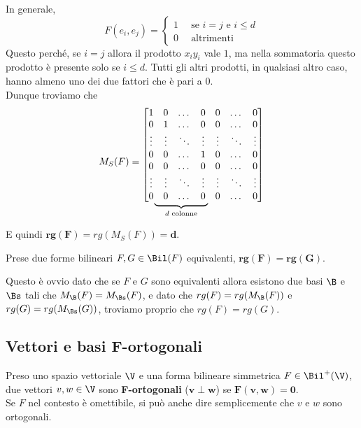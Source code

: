 \documentclass[11pt, a4paper, titlepage, oneside]{scrbook}
\begin{document}
In generale, 
\[
F(e_i,e_j) = 
\begin{cases}
1 & \enspace \text{se } i = j \text{ e } i \leq d\\
0 & \enspace \text{altrimenti}
\end{cases}
\]
Questo perché, se $i = j$ allora il prodotto $x_i y_i$ vale $1$, ma nella sommatoria questo prodotto è presente solo se $i \leq d$. Tutti gli altri prodotti, in qualsiasi altro caso, hanno almeno uno dei due fattori che è pari a $0$. \\
Dunque troviamo che
\[
M_S(F) = 
\begin{array}{@{}c@{}}
    \begin{bmatrix}
        1 & 0 & \dots & 0 & 0 & \dots & 0 \\
        0 & 1 & \dots & 0 & 0 & \dots & 0 \\
        \vdots & \vdots & \ddots & \vdots & \vdots & \ddots & \vdots \\
        0 & 0 & \dots & 1 & 0 & \dots & 0 \\
        0 & 0 & \dots & 0 & 0 & \dots & 0 \\
        \vdots & \vdots & \ddots & \vdots & \vdots & \ddots & \vdots \\
        0 & 0 & \dots & 0 & 0 & \dots & 0 
    \end{bmatrix} \\[-2ex]
    \begin{array}{@{}cc@{}}
        \underbrace{\rule{5.5em}{0pt}}_{d \text{ colonne}} & \rule{3.5em}{0pt}
    \end{array}
\end{array}
\]

E quindi $\bm{rg(F)} = rg(M_S(F)) = \bm{d}$. 

\begin{Proposizione}[Corollario]
\label{corol-rango-forme-equivalenti}
Prese due forme bilineari $F, G \in \Bil(F)$ equivalenti, $\bm{rg(F) = rg(G)}$.
\end{Proposizione}

Questo è ovvio dato che se $F$ e $G$ sono equivalenti allora esistono due basi $\B$ e $\Bs$ tali che $M_\B(F) = M_\Bs(F)$, e dato che $rg(F) = rg(M_\B(F))$ e $rg(G) = rg(M_\Bs(G))$, troviamo proprio che $rg(F) = rg(G)$.

\subsection{Vettori e basi F-ortogonali}

\begin{Definizione}
\label{def-vettori-F-ortogonali}
Preso uno spazio vettoriale $\V$ e una forma bilineare simmetrica $F \in \Bil^+(\V)$, due vettori $v,w \in \V$ sono \textbf{F-ortogonali} ($\bm{v \perp w}$) se $\bm{F(v,w) = 0}$. \\
\NB Se $F$ nel contesto è omettibile, si può anche dire semplicemente che $v$ e $w$ sono ortogonali.
\end{Definizione}
\end{document}
